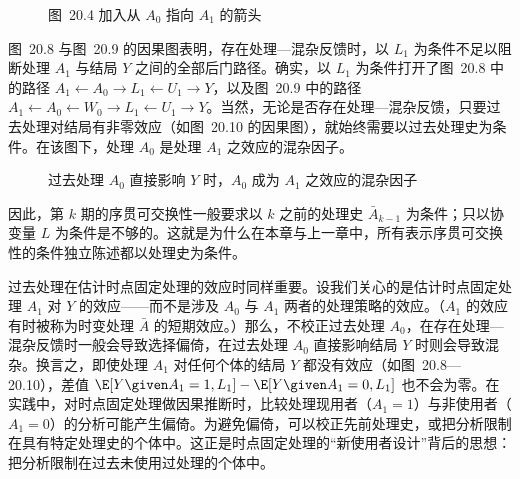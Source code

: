 \begin{figure}[htbp]
\centering
{}
\caption{图~20.4 加入从 $A_0$ 指向 $A_1$ 的箭头}
\label{fig:20.9}
\end{figure}

图~20.8 与图~20.9 的因果图表明，存在处理—混杂反馈时，以 $L_1$ 为条件不足以阻断处理 $A_1$ 与结局 $Y$ 之间的全部后门路径。确实，以 $L_1$ 为条件打开了图~20.8 中的路径 $A_1\leftarrow A_0\to L_1\leftarrow U_1\to Y$，以及图~20.9 中的路径 $A_1\leftarrow A_0\leftarrow W_0\to L_1\leftarrow U_1\to Y$。当然，无论是否存在处理—混杂反馈，只要过去处理对结局有非零效应（如图~20.10 的因果图），就始终需要以过去处理史为条件。在该图下，处理 $A_0$ 是处理 $A_1$ 之效应的混杂因子。

\begin{figure}[htbp]
\centering
{}
\caption{过去处理 $A_0$ 直接影响 $Y$ 时，$A_0$ 成为 $A_1$ 之效应的混杂因子}
\label{fig:20.10}
\end{figure}

因此，第 $k$ 期的序贯可交换性一般要求以 $k$ 之前的处理史 $\bar A_{k-1}$ 为条件；只以协变量 $L$ 为条件是不够的。这就是为什么在本章与上一章中，所有表示序贯可交换性的条件独立陈述都以处理史为条件。

过去处理在估计时点固定处理的效应时同样重要。设我们关心的是估计时点固定处理 $A_1$ 对 $Y$ 的效应——而不是涉及 $A_0$ 与 $A_1$ 两者的处理策略的效应。（$A_1$ 的效应有时被称为时变处理 $\bar A$ 的短期效应。）那么，不校正过去处理 $A_0$，在存在处理—混杂反馈时一般会导致选择偏倚，在过去处理 $A_0$ 直接影响结局 $Y$ 时则会导致混杂。换言之，即使处理 $A_1$ 对任何个体的结局 $Y$ 都没有效应（如图~20.8—20.10），差值 $\E[Y\given A_1=1,L_1]-\E[Y\given A_1=0,L_1]$ 也不会为零。在实践中，对时点固定处理做因果推断时，比较处理现用者（$A_1=1$）与非使用者（$A_1=0$）的分析可能产生偏倚。为避免偏倚，可以校正先前处理史，或把分析限制在具有特定处理史的个体中。这正是时点固定处理的“新使用者设计”背后的思想：把分析限制在过去未使用过处理的个体中。

